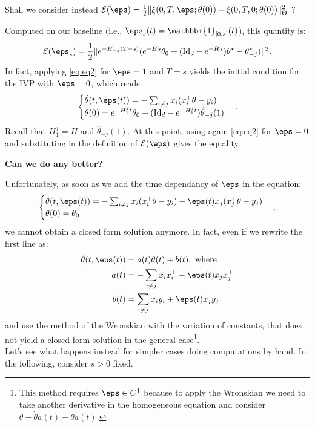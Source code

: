 \qst Shall we consider instead $\mathcal{E}(\eps)=\frac12\|\xi(0,T,\eps;\theta(0))-\xi(0,T,0;\theta(0))\|_\Theta^2$ ?

Computed on our baseline (i.e., $\eps_s(t)=\mathbbm{1}_{[0,s]}(t)$), this quantity is:
\begin{equation*}
  \mathcal{E}(\eps_s)=\frac12\|e^{-H_{-j}(T-s)} (e^{-H s} \theta_0 +(\mathrm{Id}_d-e^{-H s})\theta^\star-\theta^\star_{-j}) \|^2.
\end{equation*}
In fact, applying \ref{eq:eq2} for $\eps=1$ and $T=s$ yields the initial condition for the IVP with $\eps=0$, which reads:
\begin{equation*}
  \begin{cases}
    \dot \theta(t,\eps(t)) = -\sum_{i\neq j} x_i(x_i^\top\theta-y_i) \\
    \theta(0) = e^{-H^j_1 t} \theta_0 +(\mathrm{Id}_d-e^{-H^j_1 t})\hat\theta_{-j}(1)
  \end{cases}.
\end{equation*}
Recall that $H^j_1=H$ and $\hat\theta_{-j}(1)$. At this point, using again \ref{eq:eq2} for $\eps=0$ and substituting in the definition of $\mathcal{E}(\eps)$ gives the equality.

\begin{center}
  \textbf{Can we do any better?}
\end{center} 

Unfortunately, as soon as we add the time dependancy of $\eps$ in the equation:
\begin{equation}\label{eq:eps_t}
  \begin{cases}
    \dot \theta(t,\eps(t)) = -\sum_{i\neq j} x_i(x_i^\top\theta-y_i) - \eps(t)x_j(x_j^\top\theta-y_j) \\
    \theta(0) = \theta_0
  \end{cases} ,
\end{equation}
we cannot obtain a closed form solution anymore. In fact, even if we rewrite the first line as:
\begin{equation*}
  \begin{aligned}
    \dot \theta(t,\eps(t)) &= a(t)\theta(t) + b(t), \text{ where } \\
    a(t) &= -\sum_{i\neq j}x_ix_i^\top - \eps(t)x_jx_j^\top \\
    b(t) &= \sum_{i\neq j}x_iy_i + \eps(t)x_jy_j
  \end{aligned}
\end{equation*}
and use the method of the Wronskian with the variation of constants, that does not yield a closed-form solution in the general case\footnote{This method requires $\eps\in C^1$ because to apply the Wronskian we need to take another derivative in the homogeneous equation and consider $\ddot\theta-\dot\theta a(t) - \theta \dot a(t)$.}.\\
Let's see what happens instead for simpler cases doing computations by hand. In the following, consider $s>0$ fixed.

